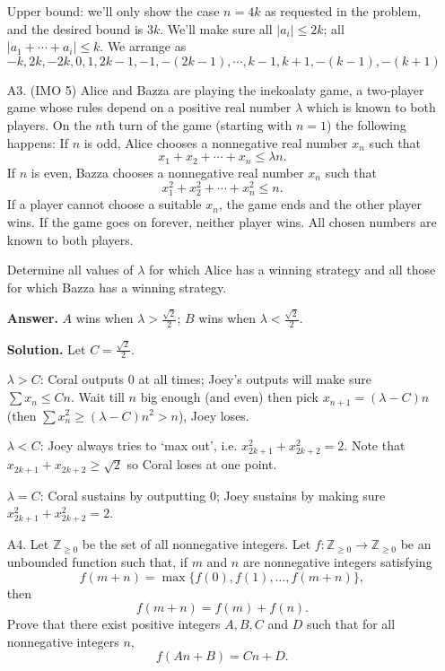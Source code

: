 \documentclass[11pt,a4paper]{article}
\begin{document}
\begin{enumerate}
		Upper bound: we'll only show the case $n=4k$ as requested in the problem, and the desired bound is $3k$. We'll make sure all $|a_i|\le 2k$; all $|a_1+\cdots + a_i|\le k$. We arrange as 
		\[
		-k, 2k, -2k, 0, 1, 2k-1, -1, -(2k-1), \cdots, k-1, k+1, -(k-1), -(k+1)
		\]
		
		\item [A3.] (IMO 5)
		Alice and Bazza are playing the inekoalaty game, a two‑player game whose rules depend on a positive real number $\lambda$ which is known to both players. On the $n$th turn of the game (starting with $n=1$) the following happens:
		If $n$ is odd, Alice chooses a nonnegative real number $x_n$ such that
		\[
		x_1 + x_2 + \cdots + x_n \le \lambda n.
		\]
		If $n$ is even, Bazza chooses a nonnegative real number $x_n$ such that
		\[
		x_1^2 + x_2^2 + \cdots + x_n^2 \le n.
		\]
		If a player cannot choose a suitable $x_n$, the game ends and the other player wins. If the game goes on forever, neither player wins. All chosen numbers are known to both players.
		
		Determine all values of $\lambda$ for which Alice has a winning strategy and all those for which Bazza has a winning strategy.
		
		\textbf{Answer.} $A$ wins when $\lambda > \frac{\sqrt{2}}{2}$; 
		$B$ wins when $\lambda < \frac{\sqrt{2}}{2}$. 
		
		\textbf{Solution.}
		Let $C = \frac{\sqrt{2}}{2}$. 
		
		$\lambda > C$: 
		Coral outputs 0 at all times; 
		Joey's outputs will make sure $\sum x_{n}\le Cn$. 
		Wait till $n$ big enough (and even) then pick $x_{n+1}=(\lambda - C)n$ (then $\sum x_{n}^2 \ge (\lambda - C)n^2 > n$), Joey loses. 
		
		$\lambda < C$: 
		Joey always tries to `max out', 
		i.e. $x_{2k+1}^2+x_{2k+2}^2 = 2$. 
		Note that $x_{2k+1}+x_{2k+2}\ge \sqrt{2}$ so Coral loses at one point. 
		
		$\lambda = C$: 
		Coral sustains by outputting 0; 
		Joey sustains by making sure $x_{2k+1}^2+x_{2k+2}^2 = 2$. 
		
		\item [A4.]
		Let $\mathbb{Z}_{\ge0}$ be the set of all nonnegative integers. Let $f:\mathbb{Z}_{\ge0}\rightarrow\mathbb{Z}_{\ge0}$ be an unbounded function such that, if $m$ and $n$ are nonnegative integers satisfying
		\[ f(m+n)=\max\{f(0),f(1),\dots,f(m+n)\}, \]then
		\[ f(m+n)=f(m)+f(n). \]Prove that there exist positive integers $A, B, C$ and $D$ such that for all nonnegative integers $n$,
		\[ f(An+B)=Cn+D. \]
		

\end{enumerate}
\end{document}
